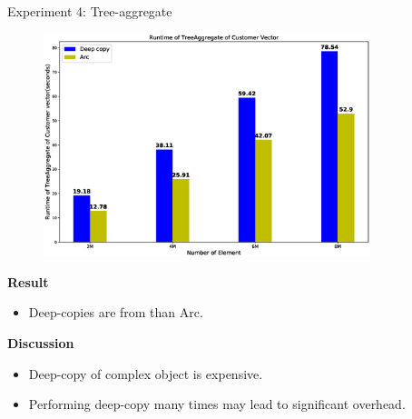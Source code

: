 \documentclass[9pt]{beamer}
\begin{document}



\begin{frame}[fragile]{Experiment 4: Tree-aggregate}
    \vspace{-0.5cm}
    \begin{figure}[hp]
        \centering
        \begin{center}
                \includegraphics[width=0.85\textwidth]{images/rust_tree_aggregate.eps}
                \captionsetup{labelformat=empty}
        \end{center}
    \end{figure}

    \vspace{-0.5cm}
    \textbf{Result}
    \begin{itemize}
        \item Deep-copies are from  than Arc.
    \end{itemize}

    \textbf{Discussion}
    \begin{itemize}
        \item Deep-copy of complex object is expensive.
        \item Performing deep-copy many times may lead to significant overhead.
    \end{itemize}

\end{frame}
\end{document}
